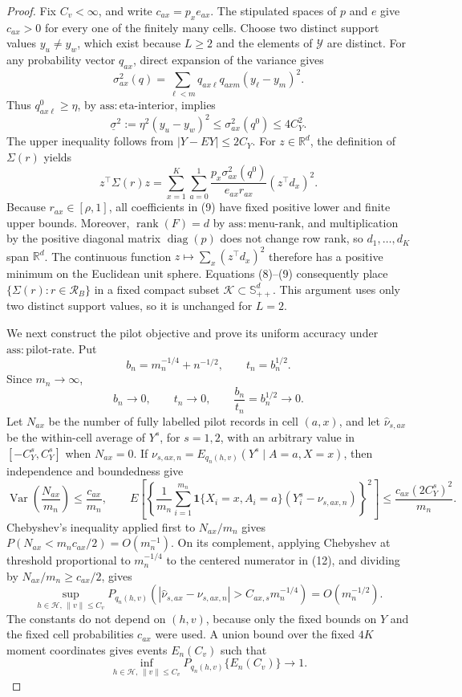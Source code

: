 \documentclass{article}
\begin{document}
\begin{proof}
Fix \(C_v<\infty\), and write \(c_{ax}=p_xe_{ax}\). The stipulated spaces of \(p\) and \(e\) give \(c_{ax}>0\) for every one of the finitely many cells. Choose two distinct support values \(y_u\ne y_w\), which exist because \(L\ge2\) and the elements of \(\mathcal Y\) are distinct. For any probability vector \(q_{ax}\), direct expansion of the variance gives
\[
\sigma^2_{ax}(q)=\sum_{\ell<m}q_{ax\ell}q_{axm}(y_\ell-y_m)^2.
\tag{7}
\]
Thus \(q^0_{ax\ell}\ge\eta\), by \(\mathrm{ass:eta\text{-}interior}\), implies
\[
\underline\sigma^2:=\eta^2(y_u-y_w)^2
\le \sigma^2_{ax}(q^0)\le 4C_Y^2.
\tag{8}
\]
The upper inequality follows from \(|Y-EY|\le2C_Y\). For \(z\in\mathbb R^d\), the definition of \(\Sigma(r)\) yields
\[
z^\top\Sigma(r)z
=\sum_{x=1}^K\sum_{a=0}^1
\frac{p_x\sigma^2_{ax}(q^0)}{e_{ax}r_{ax}}(z^\top d_x)^2.
\tag{9}
\]
Because \(r_{ax}\in[\rho,1]\), all coefficients in (9) have fixed positive lower and finite upper bounds. Moreover, \(\operatorname{rank}(F)=d\) by \(\mathrm{ass:menu\text{-}rank}\), and multiplication by the positive diagonal matrix \(\operatorname{diag}(p)\) does not change row rank, so \(d_1,\ldots,d_K\) span \(\mathbb R^d\). The continuous function \(z\mapsto\sum_x(z^\top d_x)^2\) therefore has a positive minimum on the Euclidean unit sphere. Equations (8)--(9) consequently place \(\{\Sigma(r):r\in\mathcal R_B\}\) in a fixed compact subset \(\mathcal K\subset\mathbb S_{++}^d\). This argument uses only two distinct support values, so it is unchanged for \(L=2\).

We next construct the pilot objective and prove its uniform accuracy under \(\mathrm{ass:pilot\text{-}rate}\). Put
\[
b_n=m_n^{-1/4}+n^{-1/2},\qquad t_n=b_n^{1/2}.
\tag{10}
\]
Since \(m_n\to\infty\),
\[
b_n\to0,\qquad t_n\to0,\qquad \frac{b_n}{t_n}=b_n^{1/2}\to0.
\tag{11}
\]
Let \(N_{ax}\) be the number of fully labelled pilot records in cell \((a,x)\), and let \(\widehat\nu_{s,ax}\) be the within-cell average of \(Y^s\), for \(s=1,2\), with an arbitrary value in \([-C_Y^s,C_Y^s]\) when \(N_{ax}=0\). If \(\nu_{s,ax,n}=E_{q_n(h,v)}(Y^s\mid A=a,X=x)\), then independence and boundedness give
\[
\operatorname{Var}\!\left(\frac{N_{ax}}{m_n}\right)\le\frac{c_{ax}}{m_n},
\qquad
E\!\left[\left\{\frac1{m_n}\sum_{i=1}^{m_n}
\mathbf1\{X_i=x,A_i=a\}(Y_i^s-\nu_{s,ax,n})\right\}^2\right]
\le\frac{c_{ax}(2C_Y^s)^2}{m_n}.
\tag{12}
\]
Chebyshev's inequality applied first to \(N_{ax}/m_n\) gives \(P(N_{ax}<m_nc_{ax}/2)=O(m_n^{-1})\). On its complement, applying Chebyshev at threshold proportional to \(m_n^{-1/4}\) to the centered numerator in (12), and dividing by \(N_{ax}/m_n\ge c_{ax}/2\), gives
\[
\sup_{h\in\mathcal H,\,\lVert v\rVert\le C_v}
P_{q_n(h,v)}\!\left(
|\widehat\nu_{s,ax}-\nu_{s,ax,n}|>C_{ax,s}m_n^{-1/4}
\right)=O(m_n^{-1/2}).
\tag{13}
\]
The constants do not depend on \((h,v)\), because only the fixed bounds on \(Y\) and the fixed cell probabilities \(c_{ax}\) were used. A union bound over the fixed \(4K\) moment coordinates gives events \(E_n(C_v)\) such that
\[
\inf_{h\in\mathcal H,\,\lVert v\rVert\le C_v}
P_{q_n(h,v)}\{E_n(C_v)\}\to1.
\tag{14}
\]


\end{proof}
\end{document}
